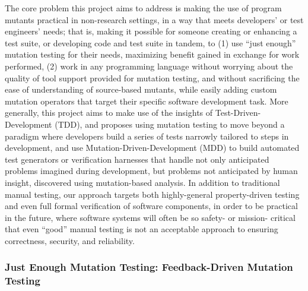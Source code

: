 The core problem this project aims to address is making the use of program mutants practical in non-research settings, in a way that meets developers' or test engineers' needs; that is, making it possible for someone creating or enhancing a test suite, or developing code and test suite in tandem, to (1) use ``just enough'' mutation testing for their needs, maximizing benefit gained in exchange for work performed, (2) work in any programming language without worrying about the quality of tool support provided for mutation testing, and without sacrificing the ease of understanding of source-based mutants, while easily adding custom mutation operators that target their specific software development task.  More generally, this project aims to make use of the insights of Test-Driven-Development (TDD), and proposes using mutation testing to move beyond a paradigm where developers build a series of tests narrowly tailored to steps in development, and use Mutation-Driven-Development (MDD) to build automated test generators or verification harnesses that handle not only anticipated problems imagined during development, but problems not anticipated by human insight, discovered using mutation-based analysis.  In addition to traditional manual testing, our approach targets both highly-general property-driven testing and even full formal verification of software components, in order to be practical in the future, where software systems will often be so safety- or mission- critical that even ``good'' manual testing is not an acceptable approach to ensuring correctness, security, and reliability.

\subsubsection{Just Enough Mutation Testing: Feedback-Driven Mutation Testing}

